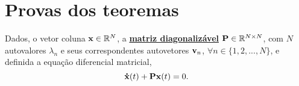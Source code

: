 \section{Provas dos teoremas}



\begin{myproofT}\label{proof:theo:differential-eq:order1:0}
Dados, o vetor coluna $\VECTOR{X} \in \mathbb{R}^N$, 
a \hyperref[def:diagonalization0]{\textbf{matriz diagonalizável}} $\MATRIX{P} \in \mathbb{R}^{N\times N}$,
com $N$ autovalores $\lambda_n$ e seus correspondentes autovetores $\VECTOR{v}_n$,
$\forall n \in \{1, 2, ..., N\}$, 
e definida a equação diferencial matricial,
\begin{equation}\label{eq:firstorder1}
\DTVECTOR{X}(t) + \MATRIX{P} \VECTOR{X}(t)=0.
\end{equation}


\end{myproofT}
